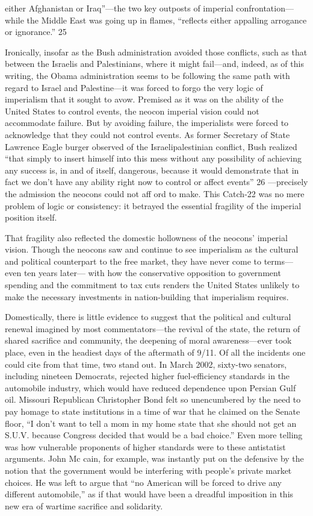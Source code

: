 either Afghanistan or Iraq”—the two key outposts of imperial confrontation— while the Middle East was going up in flames, “reflects either appalling arrogance or ignorance.” {\color{blue} 25 } {\par} Ironically, insofar as the Bush administration avoided those conflicts, such as that between the Israelis and Palestinians, where it might fail—and, indeed, as of this writing, the Obama administration seems to be following the same path with regard to Israel and Palestine—it was forced to forgo the very logic of imperialism that it sought to avow. Premised as it was on the ability of the United States to control events, the neocon imperial vision could not accommodate failure. But by avoiding failure, the imperialists were forced to acknowledge that they could not control events. As former Secretary of State Lawrence Eagle burger observed of the Israelipalestinian conflict, Bush realized “that simply to insert himself into this mess without any possibility of achieving any success is, in and of itself, dangerous, because it would demonstrate that in fact we don’t have any ability right now to control or affect events” {\color{blue} 26 } —precisely the admission the neocons could not aff ord to make. This Catch-22 was no mere problem of logic or consistency: it betrayed the essential fragility of the imperial position itself.{\par} That fragility also reflected the domestic hollowness of the neocons’ imperial vision. Though the neocons saw and continue to see imperialism as the cultural and political counterpart to the free market, they have never come to terms—even ten years later— with how the conservative opposition to government spending and the commitment to tax cuts renders the United States unlikely to make the necessary investments in nation-building that imperialism requires.{\par} Domestically, there is little evidence to suggest that the political and cultural renewal imagined by most commentators—the revival of the state, the return of shared sacrifice and community, the deepening of moral awareness—ever took place, even in the headiest days of the aftermath of 9/11. Of all the incidents one could cite from that time, two stand out. In March 2002, sixty-two senators, including nineteen Democrats, rejected higher fuel-efficiency standards in the automobile industry, which would have reduced dependence upon Persian Gulf oil. Missouri Republican Christopher Bond felt so unencumbered by the need to pay homage to state institutions in a time of war that he claimed on the Senate floor, “I don’t want to tell a mom in my home state that she should not get an S.U.V. because Congress decided that would be a bad choice.” Even more telling was how vulnerable proponents of higher standards were to these antistatist arguments. John Mc cain, for example, was instantly put on the defensive by the notion that the government would be interfering with people’s private market choices. He was left to argue that “no American will be forced to drive any different automobile,” as if that would have been a dreadful imposition in this new era of wartime sacrifice and solidarity. 